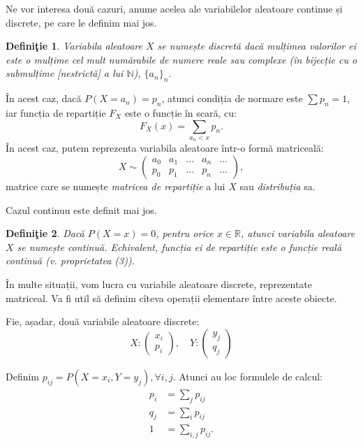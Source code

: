 \documentclass[12pt,a4paper]{article}
\newcommand\NN{\mathbb{N}}
\newcommand\RR{\mathbb{R}}
\theoremstyle{dotless}
\theoremstyle{dotlessdr}
\newtheorem{definition}{Defini\c{t}ie}
\begin{document}
Ne vor interesa două cazuri, anume acelea ale variabilelor aleatoare continue și discrete,
pe care le definim mai jos.

\begin{definition}\label{def:v-disc}
  Variabila aleatoare $ X $ se numește \emph{discretă} dacă mulțimea valorilor
  ei este o mulțime cel mult numărabile de numere reale sau complexe (în bijecție
  cu o submulțime [nestrictă] a lui $ \NN $), $ \{a_n\}_n $.
\end{definition}

În acest caz, dacă $ P(X = a_n) = p_n $, atunci condiția de normare este $ \sum p_n = 1 $,
iar funcția de repartiție $ F_X $ este o funcție în scară, cu:
\[
  F_X(x) = \sum_{a_n < x} p_n.
\]
În acest caz, putem reprezenta variabila aleatoare într-o formă matriceală:
\[
  X \sim %
  \begin{pmatrix}
    a_0 & a_1 & \dots & a_n & \dots \\
    p_0 & p_1 & \dots & p_n & \dots
  \end{pmatrix},
\]
matrice care se numește \emph{matricea de repartiție} a lui $ X $ sau \emph{distribuția} sa.

Cazul continuu este definit mai jos.

\begin{definition}\label{def:v-cont}
  Dacă $ P(X = x) = 0 $, pentru orice $ x \in \RR $, atunci variabila aleatoare $ X $ se numește
  \emph{continuă}. Echivalent, funcția ei de repartiție este o funcție reală continuă
  (v. proprietatea (3)).
\end{definition}

În multe situații, vom lucra cu variabile aleatoare discrete, reprezentate matriceal. Va fi
util să definim cîteva operații elementare între aceste obiecte.

Fie, așadar, două variabile aleatoare discrete:
\[
  X : \begin{pmatrix} x_i \\ p_i \end{pmatrix}, \quad %
  Y : \begin{pmatrix} y_j \\ q_j \end{pmatrix}
\]

Definim $ p_{ij} = P(X = x_i, Y = y_j), \forall i,j $. Atunci au loc formulele de calcul:
\begin{align*}
  p_i &= \sum_j p_{ij} \\
  q_j &= \sum_i p_{ij} \\
  1 &= \sum_{i,j} p_{ij}.
\end{align*}
\end{document}
